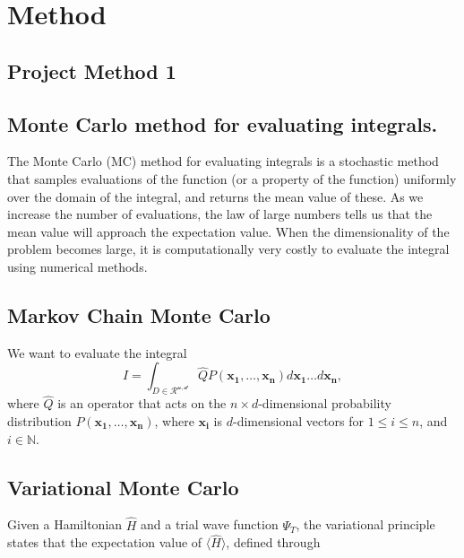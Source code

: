 \section{Method}\label{sec:Method}

\subsection{Project Method 1}\label{sec:project method}

\subsection*{Monte Carlo method for evaluating integrals.}
The Monte Carlo (MC) method for evaluating integrals is a stochastic method that samples evaluations of the function (or a property of the function) uniformly over the domain of the integral, and returns the mean value of these. As we increase the number of evaluations, the law of large numbers tells us that the mean value will approach the expectation value. When the dimensionality of the problem becomes large, it is computationally very costly to evaluate the integral using numerical methods.

\subsection*{Markov Chain Monte Carlo}
We want to evaluate the integral 
\begin{equation}
    I = \int_{D\in\mathcal{R^{n, d}}}\hat{Q}P(\mathbf{x_1}, \dots, \mathbf{x_n})d\mathbf{x_1}\dots d\mathbf{x_n},
\end{equation}
where $\hat{Q}$ is an operator that acts on the $n\times d$-dimensional probability distribution $P(\mathbf{x_1}, \dots, \mathbf{x_n})$, where $\mathbf{x_i}$ is $d$-dimensional vectors for $1\leq i\leq n$, and $i\in\mathbb{N}$. 

\subsection*{Variational Monte Carlo}
Given a Hamiltonian $\hat{H}$ and a trial wave function $\Psi_T$, the variational principle states that the expectation value of $\langle \hat{H} \rangle$, defined through
